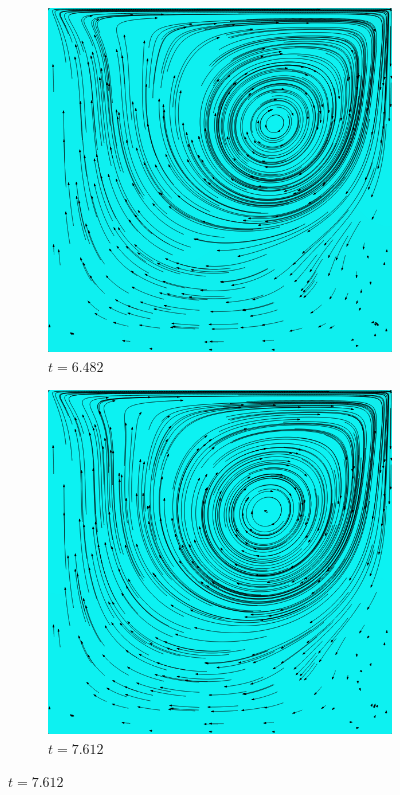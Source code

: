 		\begin{figure}[!htb]
			\centering
			\begin{subfigure}[b]{.5\textwidth}
				\includegraphics[scale = 0.28]{screenshots/re-1000-512-06482.png}
				\caption{$t=6.482$}
			\end{subfigure}%
			\begin{subfigure}[b]{.5\textwidth}
				\includegraphics[scale = 0.28]{screenshots/re-1000-512-07612.png}
				\caption{$t=7.612$}
			\end{subfigure}


\end{figure}
